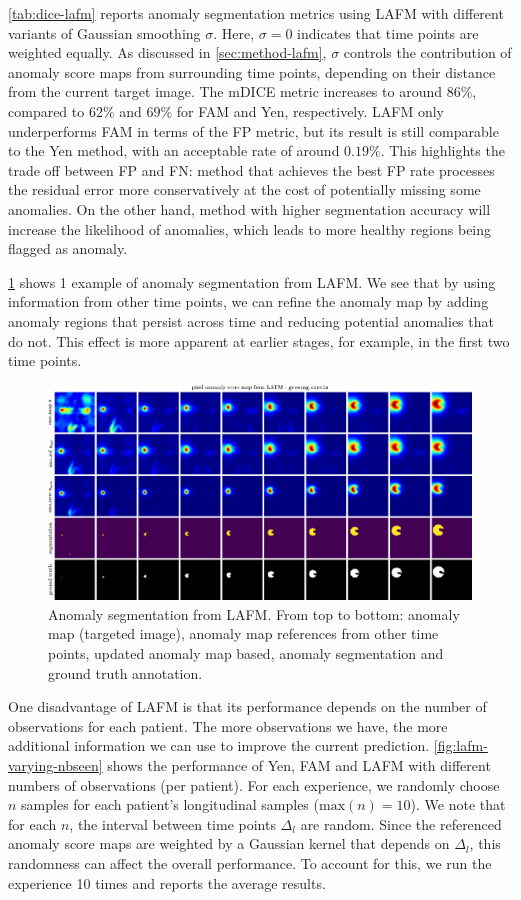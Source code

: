 \cref{tab:dice-lafm} reports anomaly segmentation metrics using LAFM with different variants of Gaussian smoothing $\sigma$. Here, $\sigma=0$ indicates that time points are weighted equally. As discussed in \cref{sec:method-lafm}, $\sigma$ controls the contribution of anomaly score maps from surrounding time points, depending on their distance from the current target image. The mDICE metric increases to around $86\%$, compared to $62\%$ and $69\%$ for FAM and Yen, respectively. LAFM only underperforms FAM in terms of the FP metric, but its result is still comparable to the Yen method, with an acceptable rate of around $0.19\%$. This highlights the trade off between FP and FN: method that achieves the best FP rate processes the residual error more conservatively at the cost of potentially missing some anomalies. On the other hand, method with higher segmentation accuracy will increase the likelihood of anomalies, which leads to more healthy regions being flagged as anomaly. 

\cref{fig:lafm-seg-gcircle} shows 1 example of anomaly segmentation from LAFM. We see that by using information from other time points, we can refine the anomaly map by adding anomaly regions that persist across time and reducing potential anomalies that do not. This effect is more apparent at earlier stages, for example, in the first two time points.

\begin{figure}[htbp]   
    \centering
    \includegraphics[width=0.75\linewidth]{figures/lafm-seg-gcircle.pdf}
    \caption[Anomaly segmentations from LAFM]{Anomaly segmentation from LAFM. From top to bottom: anomaly map (targeted image), anomaly map references from other time points, updated anomaly map based, anomaly segmentation and ground truth annotation.}
    \label{fig:lafm-seg-gcircle}
\end{figure}

One disadvantage of LAFM is that its performance depends on the number of observations for each patient. The more observations we have, the more additional information we can use to improve the current prediction. \cref{fig:lafm-varying-nbseen} shows the performance of Yen, FAM and LAFM with different numbers of observations (per patient). For each experience, we randomly choose $n$ samples for each patient's longitudinal samples ($\mathrm{max}(n) = 10$). We note that for each $n$, the interval between time points $\Delta_l$ are random. Since the referenced anomaly score maps are weighted by a Gaussian kernel that depends on $\Delta_l$, this randomness can affect the overall performance. To account for this, we run the experience 10 times and reports the average results. 

